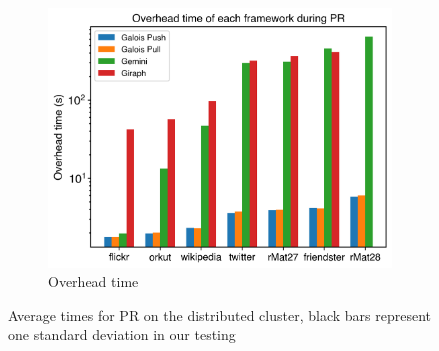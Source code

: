 \begin{figure}
\begin{subfigure}{0.32\textwidth}
		\includegraphics[width=\linewidth]{../../plots/distributedPR_overheadTime.png}
		\caption{Overhead time}
		\label{fig:distributedPR_overheadNormalized}
	\end{subfigure}
	\caption{Average times for PR on the distributed cluster, black bars represent one standard deviation in our testing}
	\label{fig:distributedPR}
\end{figure}









